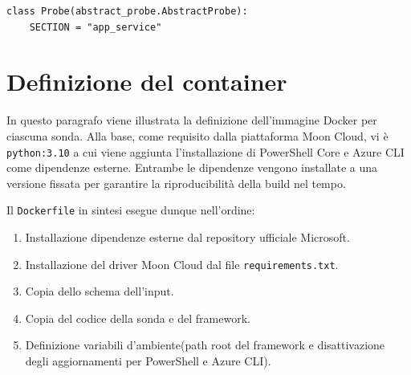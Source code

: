 \documentclass[a4paper,11pt]{report}
\begin{document}
\begin{lstlisting}[style=azcli, caption={Estratto della classe Probe all'interno di ogni sonda sviluppata.}, label={lst:section-constant}]
class Probe(abstract_probe.AbstractProbe):
    SECTION = "app_service"
\end{lstlisting}


\section{Definizione del container}

In questo paragrafo viene illustrata la definizione dell'immagine Docker per ciascuna sonda.
Alla base, come requisito dalla piattaforma Moon Cloud, vi è \texttt{python:3.10} a cui viene aggiunta l'installazione di PowerShell Core e Azure CLI come dipendenze esterne.
Entrambe le dipendenze vengono installate a una versione fissata per garantire la riproducibilità della build nel tempo.

Il \texttt{Dockerfile} in sintesi esegue dunque nell'ordine:
\begin{enumerate}
\item Installazione dipendenze esterne dal repository ufficiale Microsoft.
\item Installazione del driver Moon Cloud dal file \texttt{requirements.txt}.
\item Copia dello schema dell'input.
\item Copia del codice della sonda e del framework.
\item Definizione variabili d'ambiente(path root del framework e disattivazione degli aggiornamenti per PowerShell e Azure CLI).
\end{enumerate}
\end{document}
